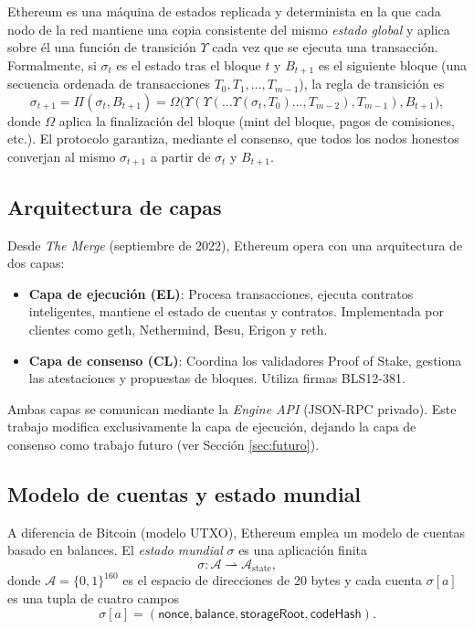 Ethereum \parencite{wood2014ethereum} es una máquina de estados replicada y determinista en la que cada nodo de la red mantiene una copia consistente del mismo \emph{estado global} y aplica sobre él una función de transición $\Upsilon$ cada vez que se ejecuta una transacción. Formalmente, si $\sigma_t$ es el estado tras el bloque $t$ y $B_{t+1}$ es el siguiente bloque (una secuencia ordenada de transacciones $T_0, T_1, \ldots, T_{m-1}$), la regla de transición es
\begin{equation}
  \sigma_{t+1} = \Pi(\sigma_t, B_{t+1}) = \Omega\bigl(\Upsilon(\Upsilon(\ldots \Upsilon(\sigma_t, T_0) \ldots, T_{m-2}), T_{m-1}), B_{t+1}\bigr),
  \label{eq:eth_state_transition}
\end{equation}
donde $\Omega$ aplica la finalización del bloque (mint del bloque, pagos de comisiones, etc.). El protocolo garantiza, mediante el consenso, que todos los nodos honestos converjan al mismo $\sigma_{t+1}$ a partir de $\sigma_t$ y $B_{t+1}$.

\subsection{Arquitectura de capas}

Desde \emph{The Merge} (septiembre de 2022), Ethereum opera con una arquitectura de dos capas:

\begin{itemize}
  \item \textbf{Capa de ejecución (EL)}: Procesa transacciones, ejecuta contratos inteligentes, mantiene el estado de cuentas y contratos. Implementada por clientes como geth, Nethermind, Besu, Erigon y reth.
  
  \item \textbf{Capa de consenso (CL)}: Coordina los validadores Proof of Stake, gestiona las atestaciones y propuestas de bloques. Utiliza firmas BLS12-381.
\end{itemize}

Ambas capas se comunican mediante la \emph{Engine API} (JSON-RPC privado). Este trabajo modifica exclusivamente la capa de ejecución, dejando la capa de consenso como trabajo futuro (ver Sección \ref{sec:futuro}).

\subsection{Modelo de cuentas y estado mundial}
\label{sec:eth_accounts}

A diferencia de Bitcoin (modelo UTXO), Ethereum emplea un modelo de cuentas basado en balances. El \emph{estado mundial} $\sigma$ es una aplicación finita
\begin{equation}
  \sigma : \mathcal{A} \rightharpoonup \mathcal{A}_{\text{state}},
\end{equation}
donde $\mathcal{A} = \{0,1\}^{160}$ es el espacio de direcciones de 20 bytes y cada cuenta $\sigma[a]$ es una tupla de cuatro campos
\begin{equation}
  \sigma[a] = (\textsf{nonce}, \textsf{balance}, \textsf{storageRoot}, \textsf{codeHash}).
  \label{eq:account}
\end{equation}

